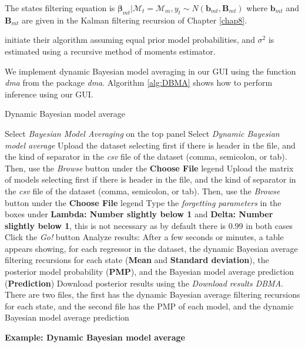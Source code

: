 The states filtering equation is $\bm{\beta}_{mt}|\mathcal{M}_{t}=\mathcal{M}_{m},y_{t}\sim N(\bm{b}_{mt},\bm{B}_{mt})$ where $\bm{b}_{mt}$ and $\bm{B}_{mt}$ are given in the Kalman filtering recursion of Chapter \ref{chap8}.

\cite{raftery2010online} initiate their algorithm assuming equal prior model probabilities, and $\sigma^2$ is estimated using a recursive method of moments estimator.

We implement dynamic Bayesian model averaging in our GUI using the function \textit{dma} from the package \textit{dma}. Algorithm \ref{alg:DBMA} shows how to perform inference using our GUI.

\begin{algorithm}[h!]
	\caption{Dynamic Bayesian model average}\label{alg:DBMA}
	\begin{algorithmic}[1]  		 			
		\State Select \textit{Bayesian Model Averaging} on the top panel
		\State Select \textit{Dynamic Bayesian model average}
		\State Upload the dataset selecting first if there is header in the file, and the kind of separator in the \textit{csv} file of the dataset (comma, semicolon, or tab). Then, use the \textit{Browse} button under the \textbf{Choose File} legend
		\State Upload the matrix of models selecting first if there is header in the file, and the kind of separator in the \textit{csv} file of the dataset (comma, semicolon, or tab). Then, use the \textit{Browse} button under the \textbf{Choose File} legend
		\State Type the \textit{forgetting parameters} in the boxes under \textbf{Lambda: Number slightly below 1} and \textbf{Delta: Number slightly below 1}, this is not necessary as by default there is 0.99 in both cases  
		\State Click the \textit{Go!} button
		\State Analyze results: After a few seconds or minutes, a table appears showing, for each regressor in the dataset, the dynamic Bayesian average filtering recursions for each state (\textbf{Mean} and \textbf{Standard deviation}), the posterior model probability (\textbf{PMP}), and the Bayesian model average prediction (\textbf{Prediction})
		\State Download posterior results using the \textit{Download results DBMA}. There are two files, the first has the dynamic Bayesian average filtering recursions for each state, and the second file has the PMP of each model, and the dynamic Bayesian model average prediction
	\end{algorithmic} 
\end{algorithm}

\textbf{Example: Dynamic Bayesian model average}

